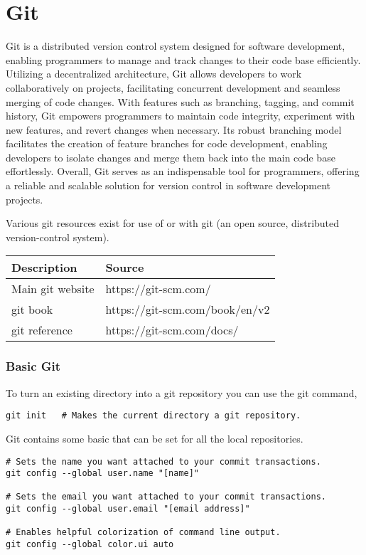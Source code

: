 \chapter{Git}
\thispagestyle{fancy}
\lstset{}\lstset{language=bash, style=gitstyle}

Git is a distributed version control system designed for software development, enabling programmers to manage and track changes to their code base efficiently. Utilizing a decentralized architecture, Git allows developers to work collaboratively on projects, facilitating concurrent development and seamless merging of code changes. With features such as branching, tagging, and commit history, Git empowers programmers to maintain code integrity, experiment with new features, and revert changes when necessary. Its robust branching model facilitates the creation of feature branches for code development, enabling developers to isolate changes and merge them back into the main code base effortlessly. Overall, Git serves as an indispensable tool for programmers, offering a reliable and scalable solution for version control in software development projects.

\begin{fancybox}{}	
	Various git resources exist for use of or with git (an open source, distributed version-control system).
	\begin{center}
		\begin{tabular}{l|l}
			Description & Source \\
			\hline
			Main git website & https://git-scm.com/ \\
			git book & https://git-scm.com/book/en/v2 \\
			git reference & https://git-scm.com/docs/
		\end{tabular}
	\end{center}
\end{fancybox}

\subsection{Basic Git}

To turn an existing directory into a git repository you can use the git  command,
\begin{lstlisting}[style=terminalstyle]
git init   # Makes the current directory a git repository.
\end{lstlisting}

Git contains some basic  that can be set for all the local repositories.
\begin{lstlisting}[style=terminalstyle]
# Sets the name you want attached to your commit transactions.
git config --global user.name "[name]"

# Sets the email you want attached to your commit transactions.
git config --global user.email "[email address]"

# Enables helpful colorization of command line output.
git config --global color.ui auto
\end{lstlisting}

